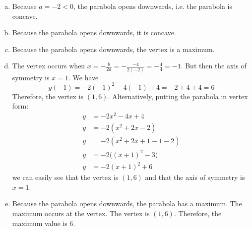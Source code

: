 \documentclass[11pt,letterpaper]{article}
\begin{document}
\sol
\begin{enumerate}[(a)]
\item Because $a= -2 < 0$, the parabola opens downwards, i.e. the parabola is concave. \pspace

\item Because the parabola opens downwards, it is concave. \pspace

\item Because the parabola opens downwards, the vertex is a maximum. \pspace

\item The vertex occurs when $x= -\frac{b}{2a}= -\frac{-4}{2(-2)}= -\frac{4}{4}= -1$. But then the axis of symmetry is $x= 1$. We have
	\[
	y(-1)= -2(-1)^2 - 4(-1) + 4= -2 + 4 + 4= 6
	\]
Therefore, the vertex is $(1, 6)$. Alternatively, putting the parabola in vertex form:
	\[
	\begin{aligned}
	y&= -2x^2 - 4x + 4 \\[0.3cm]
	y&= -2(x^2 + 2x - 2) \\[0.3cm]
	y&= -2(x^2 + 2x + 1 - 1 - 2) \\[0.3cm]
	y&= -2\big( (x + 1)^2  - 3 \big) \\[0.3cm]
	y&= -2(x + 1)^2 + 6
	\end{aligned}
	\]
we can easily see that the vertex is $(1, 6)$ and that the axis of symmetry is $x= 1$. \pspace

\item Because the parabola opens downwards, the parabola has a maximum. The maximum occurs at the vertex. The vertex is $(1, 6)$. Therefore, the maximum value is $6$. 
\end{enumerate}


\end{document}
